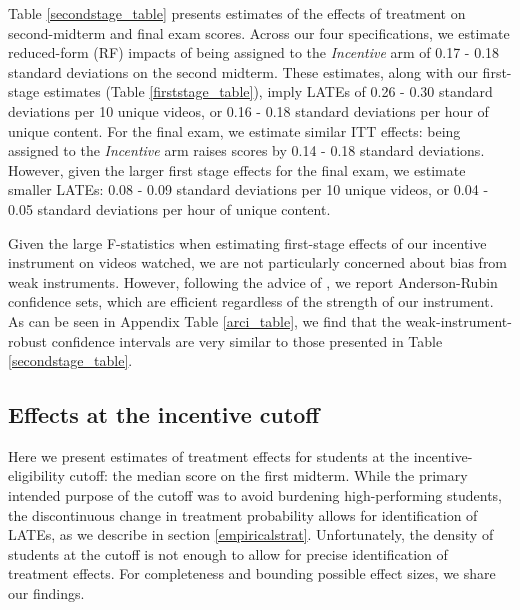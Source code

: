 \documentclass[12pt]{article}
\begin{document}
Table \ref{secondstage_table} presents estimates of the effects of treatment on second-midterm and final exam scores. Across our four specifications, we estimate reduced-form (RF) impacts of being assigned to the \textit{Incentive} arm of 0.17 - 0.18 standard deviations on the second midterm. These estimates, along with our first-stage estimates (Table \ref{firststage_table}), imply LATEs of 0.26 - 0.30 standard deviations per 10 unique videos, or 0.16 - 0.18 standard deviations per hour of unique content. %
For the final exam, we estimate similar ITT effects: being assigned to the \textit{Incentive} arm raises scores by 0.14 - 0.18 standard deviations. However, given the larger first stage effects for the final exam, we estimate smaller LATEs: 0.08 - 0.09 standard deviations per 10 unique videos, or 0.04 - 0.05 standard deviations per hour of unique content.

Given the large F-statistics when estimating first-stage effects of our incentive instrument on videos watched, we are not particularly concerned about bias from weak instruments. However, following the advice of \textcite{ass2019}, we report Anderson-Rubin confidence sets, which are efficient regardless of the strength of our instrument. As can be seen in Appendix Table \ref{arci_table}, we find that the weak-instrument-robust confidence intervals are very similar to those presented in Table \ref{secondstage_table}.

\subsection{Effects at the incentive cutoff}

Here we present estimates of treatment effects for students at the incentive-eligibility cutoff: the median score on the first midterm. While the primary intended purpose of the cutoff was to avoid burdening high-performing students, the discontinuous change in treatment probability allows for identification of LATEs, as we describe in section \ref{empiricalstrat}. Unfortunately, the density of students at the cutoff is not enough to allow for precise identification of treatment effects. For completeness and bounding possible effect sizes, we share our findings. %
\end{document}
